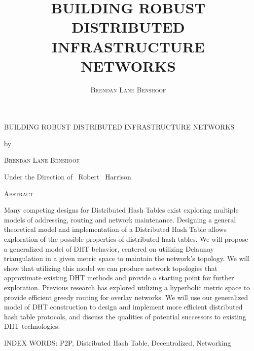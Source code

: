 \documentclass[12pt,letterpaper]{report}
\title{\textsc{BUILDING ROBUST DISTRIBUTED INFRASTRUCTURE NETWORKS}}
\author{\textsc{Brendan Lane Benshoof}}
\date{}
\begin{document}
	

	
	\begin{center}
		{\scshape BUILDING ROBUST DISTRIBUTED INFRASTRUCTURE NETWORKS\par}
		\vspace{0.5cm}
		{by\par}
		\vspace{0.5cm}
		{\scshape Brendan Lane Benshoof\par}
		\vspace{0.5cm}
		{Under the Direction of ~Robert ~Harrison \par}
		\vspace{0.5cm}
		{\scshape Abstract \par}
		
	\end{center}
	
	Many competing designs for Distributed Hash Tables exist exploring multiple models of addressing, routing and network maintenance. 
Designing a general theoretical model and implementation of a Distributed Hash Table allows exploration of the possible properties of distributed hash tables. We will propose a generalized model of DHT behavior, centered on utilizing Delaunay triangulation in a given metric space to maintain the network’s topology. 
We will show that utilizing this model we can produce network topologies that approximate existing DHT methods and provide a starting point for further exploration.
Previous research has explored utilizing a hyperbolic metric space to provide efficient greedy routing for overlay networks.
We will use our generalized model of DHT construction to design and implement more efficient distributed hash table protocols, and discuss the qualities of potential successors to existing DHT technologies.

\vfill
INDEX WORDS: P2P, Distributed Hash Table, Decentralized, Networking

	
	

	
	
\end{document}

